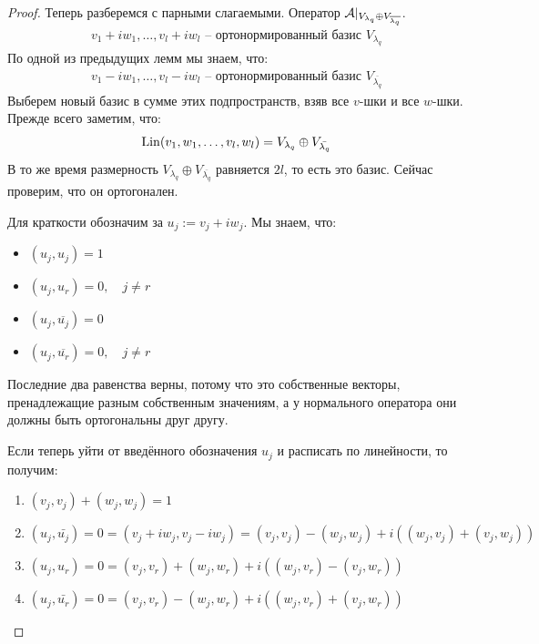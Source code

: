 \begin{theorem}
\begin{proof}
    Теперь разберемся с парными слагаемыми. Оператор 
    $\mathcal{A} |_{V_{\lambda_q} \oplus V_{\overline{\lambda_{q}}}}$. 
    \begin{gather*}
        v_1 + iw_1, \dots, v_l + iw_l \text{ -- ортонормированный базис } V_{\lambda_q}
    \end{gather*}
    По одной из предыдущих лемм мы знаем, что:
    \begin{gather*}
        v_1 - iw_1, \dots, v_l - iw_l \text{ -- ортонормированный базис } V_{\overline{\lambda_q}}
    \end{gather*}
    Выберем новый базис в сумме этих подпространств, взяв все $v$-шки и все $w$-шки. Прежде всего заметим, что:
    \begin{gather*}
        \operatorname{Lin} (v_1, w_1, \dots, v_l, w_l) = V_{\lambda_q} \oplus V_{\bar{\lambda_q}}
    \end{gather*}
    В то же время размерность $V_{\lambda_q} \oplus V_{\overline{\lambda_{q}}}$ равняется $2l$, то есть это базис. 
    Сейчас проверим, что он ортогонален.

    Для краткости обозначим за $u_j := v_j + iw_j$. Мы знаем, что:
    \begin{itemize}
        \item $(u_j, u_j) = 1$
        \item $(u_j, u_r) = 0, \quad j \neq r$
        \item $(u_j, \overline{u_j}) = 0$
        \item $(u_j, \overline{u_r}) = 0, \quad j \neq r$
    \end{itemize}
    Последние два равенства верны, потому что это собственные векторы, пренадлежащие разным собственным значениям, 
    а у нормального оператора они должны быть ортогональны друг другу.

    Если теперь уйти от введённого обозначения $u_j$ и расписать по линейности, то получим:
    \begin{enumerate}
        \item $ (v_j, v_j) + (w_j, w_j) = 1  $
        \item $ (u_j, \bar{u_j}) = 0 = (v_j + iw_j, v_j - iw_j) = (v_j, v_j) - (w_j, w_j) + i ( (w_j, v_j) + (v_j, w_j) )$
        \item $(u_j, u_r) = 0 = (v_j, v_r) + (w_j, w_r) + i ( (w_j, v_r ) - (v_j, w_r) )$
        \item $(u_j, \bar{u_r}) = 0 = (v_j, v_r) - (w_j, w_r) + i ( (w_j, v_r ) + (v_j, w_r) )$
    \end{enumerate}
    

\end{proof}
\end{theorem}
